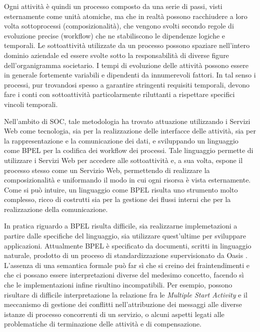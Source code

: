 Ogni attività è quindi un processo composto da una serie di passi, visti
esternamente come unità atomiche, ma che in realtà possono racchiudere a loro
volta sottoprocessi (composizionalità), che vengono svolti secondo regole di
evoluzione precise (workflow) che ne stabiliscono le dipendenze logiche e
temporali. Le sottoattività utilizzate da un processo possono spaziare
nell'intero dominio aziendale ed essere svolte sotto la responsabilità di diverse
figure dell'organigramma societario. I tempi di evoluzione delle attività possono
essere in generale fortemente variabili e dipendenti da innumerevoli fattori. In
tal senso i processi, pur trovandosi spesso a garantire stringenti requisiti
temporali, devono fare i conti con sottoattività particolarmente riluttanti a
rispettare specifici vincoli temporali.

Nell'ambito di SOC, tale metodologia ha trovato attuazione
utilizzando i Servizi Web come tecnologia, sia per la realizzazione delle interfacce delle
attività, sia per la rappresentazione e la comunicazione dei dati, e
sviluppando un linguaggio come BPEL \cite{BPEL11Spec} per la codifica dei
workflow dei processi. Tale linguaggio permette di utilizzare i Servizi Web per
accedere alle sottoattività e, a sua volta, espone il processo stesso come un Servizio Web,
permettendo di realizzare la composizionalità e uniformando il modo in cui ogni
risorsa è vista esternamente. Come si può intuire, un linguaggio come
BPEL risulta uno strumento molto complesso, ricco di costrutti sia per la gestione
dei flussi interni che per la realizzazione della comunicazione.

In pratica riguardo a BPEL risulta difficile, sia realizzarne implemetazioni a
partire dalle specifiche del linguaggio, sia utilizzare quest'ultime per
sviluppare applicazioni. Attualmente BPEL è specificato da documenti, scritti
in linguaggio naturale, prodotto di un proceso di standardizzazione supervisionato da Oasis \cite{OASISSite}. L'assenza di una semantica formale può far sì che si creino dei fraintendimenti e che ci possano
essere interpretazioni diverse del medesimo concetto, facendo sì che le
implementazioni infine risultino incompatibili. Per esempio, possono risultare
di difficile interpretazione la relazione fra le \emph{Multiple Start Activity} e
il meccanismo di gestione dei conflitti nell'attribuzione dei messaggi alle
diverse istanze di processo concorrenti di un servizio, o alcuni aspetti legati
alle problematiche di terminazione delle attività e di compensazione.

